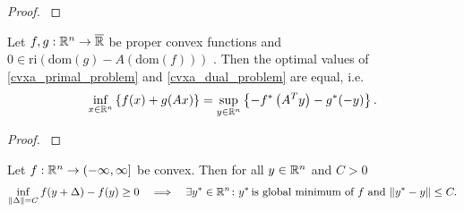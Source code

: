 \begin{proof}
  \cite[Proposition 4.62]{Mordukhovich2022}
  \end{proof}
\begin{theorem}
  \label{cvxa_fenchel_theorem}
  Let 
  $f, g : \mathbb{R}^n \to \overline{\mathbb{R}}$ 
  be proper convex functions
  and
  $0 \in \text{ri}(\text{dom}(g) - A (\text{dom}(f)) )$
  .
  Then the optimal values of \eqref{cvxa_primal_problem} and \eqref{cvxa_dual_problem} are equal, 
  i.e.
  \begin{gather}
    \inf_{x \in \mathbb{R}^n} 
    \left\{ f(x) + g(Ax) \right\}
    =
    \sup_{y \in \mathbb{R}^n} \left\{   -f^* \left( A^T y \right) - g^*(-y) \right\}
    .
  \end{gather}
\end{theorem}
\begin{proof}
  \cite[Theorem~4.63]{Mordukhovich2022}
\end{proof}
\begin{lemma}
  \label{syu_1_result}
  Let 
  $f : \mathbb{R}^n \to (-\infty, \infty]$ 
  be convex.
  Then 
  for all $y \in \mathbb{R}^n$ and $C>0$ 
    \begin{gather}
      \label{7060_0}
      \inf_{\left\lVert\Delta\right\rVert=C} f(y+\Delta) - f(y) \ge 0 \quad
      \Longrightarrow
      \quad
    \exists y^* \in \mathbb{R}^n
    \colon
    y^* \,\text{is global minimum of $f$ and}\,
      \left\lVert y^* - y\right\rVert \le C.
    \end{gather}
\end{lemma}
